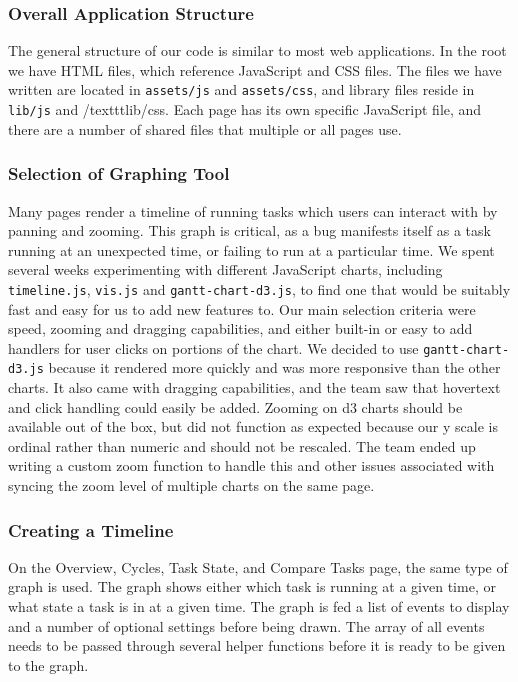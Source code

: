 \documentclass{hmcclinic}
\begin{document}
  \subsubsection{Overall Application Structure}

  The general structure of our code is similar to most web applications. In the
  root we have HTML files, which reference JavaScript and CSS files. The files
  we have written are located in \texttt{assets/js} and \texttt{assets/css}, and
  library files reside in \texttt{lib/js} and /texttt{lib/css}.  Each page has
  its own specific JavaScript file, and there are a number of shared files that
  multiple or all pages use.
  
  \subsubsection{Selection of Graphing Tool} %
  Many pages render a timeline of running tasks which users can interact
  with by panning and zooming. This graph is critical, as a bug manifests
  itself as a task running at an unexpected time, or failing to run at a
  particular time. We spent several weeks experimenting with different
  JavaScript charts, including \texttt{timeline.js}, \texttt{vis.js} and
  \texttt{gantt-chart-d3.js},
  to find one that would be suitably fast and easy for us to add new
  features to. Our main selection criteria were speed, zooming and dragging
  capabilities, and either built-in or easy to add handlers for user clicks
  on portions of the chart. We decided to use \texttt{gantt-chart-d3.js} because it
  rendered more quickly and was more responsive than the other charts. It
  also came with dragging capabilities, and the team saw that hovertext and
  click handling could easily be added. Zooming on d3 charts should be
  available out of the box, but did not function as expected because our y scale
  is ordinal rather than numeric and should not be rescaled. The team
  ended up writing a custom zoom function to handle this and other issues
  associated with syncing the zoom level of multiple charts on the same page.
  
  \subsubsection{Creating a Timeline}
  On the Overview, Cycles, Task State, and Compare Tasks page, the same type of
  graph is used. The graph shows either which task is running at a given time,
  or what state a task is in at a given time. The graph is fed a list of
  events to display and a number of optional settings before being drawn. The
  array of all events needs to be passed through several helper functions
  before it is ready to be given to the graph.
  
\end{document}
